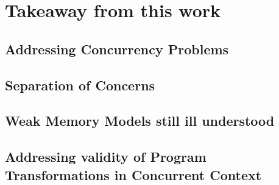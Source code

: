 \section{Takeaway from this work}

    \subsection{Addressing Concurrency Problems}

    \subsection{Separation of Concerns}

    \subsection{Weak Memory Models still ill understood}

    \subsection{Addressing validity of Program Transformations in Concurrent Context}
